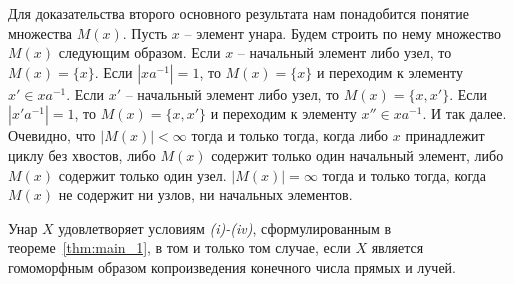 \documentclass[11pt,twoside,final
]{article}
\begin{document}
Для доказательства второго основного результата нам понадобится понятие множества $M(x)$.
Пусть $x$ -- элемент унара.
Будем строить по нему множество $M(x)$ следующим образом.
Если $x$ -- начальный элемент либо узел, то $M(x) = \{ x \}$.
Если $|xa^{-1}| = 1$, то $M(x) = \{ x \}$ и переходим к элементу $x' \in x a^{-1}$.
Если $x'$ -- начальный элемент либо узел, то $M(x) = \{ x, x' \}$.
Если $|x' a^{-1}| = 1$, то $M(x) = \{ x, x' \}$ и переходим к элементу $x'' \in x a^{-1}$.
И так далее.
Очевидно, что $|M(x)| < \infty$ тогда и только тогда, когда либо $x$ принадлежит циклу без хвостов, либо $M(x)$ содержит только один начальный элемент, либо $M(x)$ содержит только один узел.
$|M(x)| = \infty$ тогда и только тогда, когда $M(x)$ не содержит ни узлов, ни начальных элементов.
\begin{theorem} \label{thm:main_2}
	Унар $X$ удовлетворяет условиям \textit{(i)-(iv)}, сформулированным в теореме~\ref{thm:main_1}, в том и только том случае, если $X$ является гомоморфным образом копроизведения конечного числа прямых и лучей.
\end{theorem}
\end{document}
